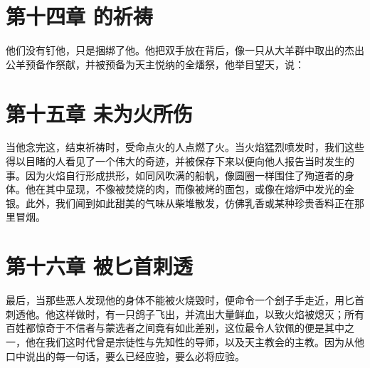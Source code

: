 
\section{第十四章 的祈祷}

他们没有钉他，只是捆绑了他。他把双手放在背后，像一只从大羊群中取出的杰出公羊预备作祭献，并被预备为天主悦纳的全燔祭，他举目望天，说：\par

\par


\section{第十五章 未为火所伤}

当他念完这，结束祈祷时，受命点火的人点燃了火。当火焰猛烈喷发时，我们这些得以目睹的人看见了一个伟大的奇迹，并被保存下来以便向他人报告当时发生的事。因为火焰自行形成拱形，如同风吹满的船帆，像圆圈一样围住了殉道者的身体。他在其中显现，不像被焚烧的肉，而像被烤的面包，或像在熔炉中发光的金银。此外，我们闻到如此甜美的气味从柴堆散发，仿佛乳香或某种珍贵香料正在那里冒烟。\par


\section{第十六章 被匕首刺透}

最后，当那些恶人发现他的身体不能被火烧毁时，便命令一个刽子手走近，用匕首刺透他。他这样做时，有一只鸽子飞出，并流出大量鲜血，以致火焰被熄灭；所有百姓都惊奇于不信者与蒙选者之间竟有如此差别，这位最令人钦佩的便是其中之一，他在我们这时代曾是宗徒性与先知性的导师，以及天主教会的主教。因为从他口中说出的每一句话，要么已经应验，要么必将应验。\par


